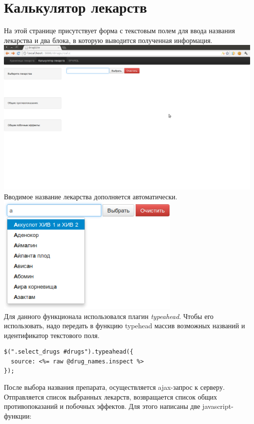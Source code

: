\documentclass[specialist,subf,href,colorlinks=true
]{disser}
\begin{document}
\section{Калькулятор лекарств}
На этой странице присутствует форма с текстовым полем для ввода названия лекарства и два блока, в которую выводится полученная информация.
\\ \includegraphics[width=160mm]{7.png}
\\ Вводимое название лекарства дополняется автоматически.
\\ \includegraphics[width=90mm]{6.png}
\\Для данного функционала использовался плагин \textit{typeahead}. Чтобы его использовать, надо передать в функцию typehead массив возможных названий и идентификатор текстового поля.
\begin{lstlisting}
$(".select_drugs #drugs").typeahead({
  source: <%= raw @drug_names.inspect %>
});
\end{lstlisting}
После выбора названия препарата, осуществляется ajax-запрос к серверу. Отправляется список выбранных лекарств, возвращается список общих противопоказаний и побочных эффектов.
Для этого написаны две javascript-функции:
\end{document}
